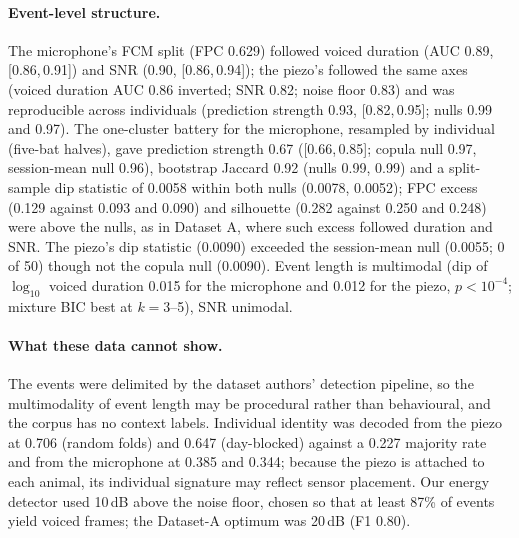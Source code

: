 \documentclass[11pt]{article}
\newcommand{\ci}[2]{[#1,\,#2]}
\begin{document}
\paragraph{Event-level structure.} The microphone's FCM split (FPC 0.629) followed voiced duration (AUC 0.89, \ci{0.86}{0.91}) and SNR (0.90, \ci{0.86}{0.94}); the piezo's followed the same axes (voiced duration AUC 0.86 inverted; SNR 0.82; noise floor 0.83) and was reproducible across individuals (prediction strength 0.93, \ci{0.82}{0.95}; nulls 0.99 and 0.97). The one-cluster battery for the microphone, resampled by individual (five-bat halves), gave prediction strength 0.67 (\ci{0.66}{0.85}; copula null 0.97, session-mean null 0.96), bootstrap Jaccard 0.92 (nulls 0.99, 0.99) and a split-sample dip statistic of 0.0058 within both nulls (0.0078, 0.0052); FPC excess (0.129 against 0.093 and 0.090) and silhouette (0.282 against 0.250 and 0.248) were above the nulls, as in Dataset A, where such excess followed duration and SNR. The piezo's dip statistic (0.0090) exceeded the session-mean null (0.0055; 0 of 50) though not the copula null (0.0090). Event length is multimodal (dip of $\log_{10}$ voiced duration 0.015 for the microphone and 0.012 for the piezo, $p<10^{-4}$; mixture BIC best at $k=3$--5), SNR unimodal.
\paragraph{What these data cannot show.} The events were delimited by the dataset authors' detection pipeline, so the multimodality of event length may be procedural rather than behavioural, and the corpus has no context labels. Individual identity was decoded from the piezo at 0.706 (random folds) and 0.647 (day-blocked) against a 0.227 majority rate and from the microphone at 0.385 and 0.344; because the piezo is attached to each animal, its individual signature may reflect sensor placement. Our energy detector used 10\,dB above the noise floor, chosen so that at least 87\% of events yield voiced frames; the Dataset-A optimum was 20\,dB (F1 0.80).
\end{document}
